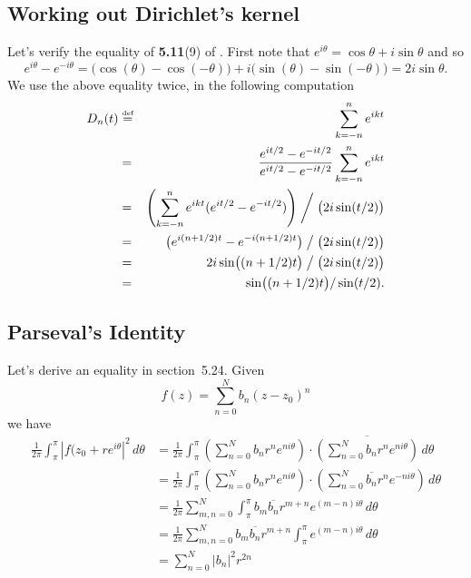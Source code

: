 \subsection{Working out Dirichlet's kernel}


Let's verify the equality of \textbf{5.11}(9) of \cite{RudinRCA80}.
First note that
\(e^{i\theta} = \cos\theta + i\sin\theta\)
and so
\begin{equation*}
e^{i\theta} - e^{-i\theta}
=     \bigl(\cos(\theta) - \cos(-\theta)\bigr)
  +  i\bigl(\sin(\theta) - \sin(-\theta)\bigr)
= 2i\sin\theta.
\end{equation*}
We use the above equality twice, in the following computation
\begin{eqnarray*}
D_n(t)
 &\stackrel{\mbox{\upshape\tiny def}}{=}& \sum_{k=-n}^n e^{ikt} \\
 &=&      \frac{e^{it/2} - e^{-it/2}}{e^{it/2} - e^{-it/2}}
           \sum_{k=-n}^n e^{ikt} \\
 &=& \left(\sum_{k=-n}^n e^{ikt}(e^{it/2} - e^{-it/2})\right)
     \biggm/
     \bigl(2i\sin(t/2)\bigr)\\
 &=& \bigl(e^{i(n+1/2)t} - e^{-i(n+1/2)t}\bigr) \bigm/
     \bigl(2i\sin(t/2)\bigr) \\
 &=& 2i\sin\bigl((n+1/2)t\bigr) \bigm/
     \bigl(2i\sin(t/2)\bigr) \\
 &=& \sin\bigl((n+1/2)t\bigr) / \sin(t/2). \\
\end{eqnarray*}

\subsection{Parseval's Identity}

Let's derive an equality in section~5.24. Given 
\begin{equation*}
f(z) = \sum_{n=0}^N b_n(z-z_0)^n
\end{equation*}
we have
\begin{align*}
 \frac{1}{2\pi}
  \int_\pi^\pi \left|f(z_0 + re^{i\theta}\right|^2\,d\theta
&= \frac{1}{2\pi} \int_\pi^\pi 
   \left(\sum_{n=0}^N b_n r^n e^{ni\theta}\right) 
   \cdot
   \overline{\left(\sum_{n=0}^N b_n r^n e^{ni\theta}\right)}
   \,d\theta \\
&= \frac{1}{2\pi} \int_\pi^\pi 
   \left(\sum_{n=0}^N b_n r^n e^{ni\theta}\right) 
   \cdot
   \left(\sum_{n=0}^N \overline{b_n} r^n e^{-ni\theta}\right)
   \,d\theta \\
&=  \frac{1}{2\pi}  \sum_{m,n=0}^N  \int_\pi^\pi 
   b_m \overline{b_n} r^{m+n} e^{(m-n)i\theta}
   \,d\theta \\
&=  \frac{1}{2\pi}  \sum_{m,n=0}^N  
    b_m \overline{b_n} r^{m+n} 
   \int_\pi^\pi e^{(m-n)i\theta}
   \,d\theta \\
&=  \sum_{n=0}^N |b_n|^2 r^{2n} 
\end{align*}


